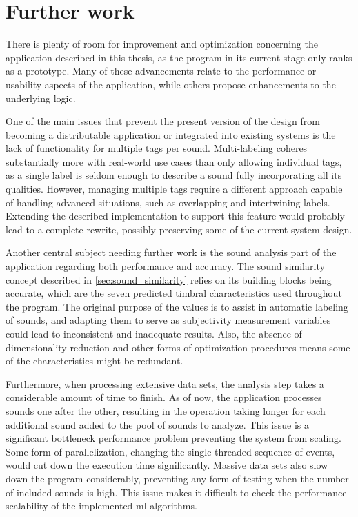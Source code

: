 \section{Further work}\label{sec:further_work}
There is plenty of room for improvement and optimization concerning the application described in this thesis, as the program in its current stage only ranks as a prototype. Many of these advancements relate to the performance or usability aspects of the application, while others propose enhancements to the underlying logic.

One of the main issues that prevent the present version of the design from becoming a distributable application or integrated into existing systems is the lack of functionality for multiple tags per sound. Multi-labeling coheres substantially more with real-world use cases than only allowing individual tags, as a single label is seldom enough to describe a sound fully incorporating all its qualities. However, managing multiple tags require a different approach capable of handling advanced situations, such as overlapping and intertwining labels. Extending the described implementation to support this feature would probably lead to a complete rewrite, possibly preserving some of the current system design.

Another central subject needing further work is the sound analysis part of the application regarding both performance and accuracy. The sound similarity concept described in \cref{sec:sound_similarity} relies on its building blocks being accurate, which are the seven predicted timbral characteristics used throughout the program. The original purpose of the values is to assist in automatic labeling of sounds, and adapting them to serve as subjectivity measurement variables could lead to inconsistent and inadequate results. Also, the absence of dimensionality reduction and other forms of optimization procedures means some of the characteristics might be redundant.

Furthermore, when processing extensive data sets, the analysis step takes a considerable amount of time to finish. As of now, the application processes sounds one after the other, resulting in the operation taking longer for each additional sound added to the pool of sounds to analyze. This issue is a significant bottleneck performance problem preventing the system from scaling. Some form of parallelization, changing the single-threaded sequence of events, would cut down the execution time significantly. Massive data sets also slow down the program considerably, preventing any form of testing when the number of included sounds is high. This issue makes it difficult to check the performance scalability of the implemented \gls{ml} algorithms.

